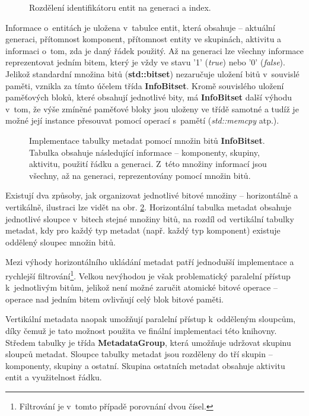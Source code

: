 \begin{figure}[H]
	\begin{center}
	\end{center}
	\caption{Rozdělení identifikátoru entit na generaci a index.}
	\label{Fig:IMPLIdent}
\end{figure}

Informace o~entitách je uložena v~tabulce entit, která obsahuje -- aktuální generaci, přítomnost komponent, přítomnost entity ve skupinách, aktivitu a informaci o~tom, zda je daný řádek použitý. Až na generaci lze všechny informace reprezentovat jedním bitem, který je vždy ve stavu '1' (\emph{true}) nebo '0' (\emph{false}). Jelikož standardní množina bitů (\textbf{std::bitset}) nezaručuje uložení bitů v~souvislé paměti, vznikla za tímto účelem třída \textbf{InfoBitset}. Kromě souvislého uložení paměťových bloků, které obsahují jednotlivé bity, má \textbf{InfoBitset} další výhodu v~tom, že výše zmíněné paměťové bloky jsou uloženy ve třídě samotné a tudíž je možné její instance přesouvat pomocí operací s~pamětí (\emph{std::memcpy} atp.).

\begin{figure}[H]
	\begin{center}
	\end{center}
	\caption{Implementace tabulky metadat pomocí množin bitů \textbf{InfoBitset}. Tabulka obsahuje následující informace -- komponenty, skupiny, aktivitu, použití řádku a generaci. Z~této množiny informací jsou všechny, až na generaci, reprezentovány pomocí množin bitů.}
	\label{Fig:IMPLMetadata}
\end{figure}

Existují dva způsoby, jak organizovat jednotlivé bitové množiny -- horizontálně a vertikálně, ilustraci lze vidět na obr. \ref{Fig:IMPLMetadata}. Horizontální tabulka metadat obsahuje jednotlivé sloupce v~bitech stejné množiny bitů, na rozdíl od vertikální tabulky metadat, kdy pro každý typ metadat (např. každý typ komponent) existuje oddělený sloupec množin bitů. 

Mezi výhody horizontálního ukládání metadat patří jednodušší implementace a rychlejší filtrování\footnote{Filtrování je v~tomto případě porovnání dvou čísel.}. Velkou nevýhodou je však problematický paralelní přístup k~jednotlivým bitům, jelikož není možné zaručit atomické bitové operace -- operace nad jedním bitem ovlivňují celý blok bitové paměti. 

Vertikální metadata naopak umožňují paralelní přístup k~odděleným sloupcům, díky čemuž je tato možnost použita ve finální implementaci této knihovny. Středem tabulky je třída \textbf{MetadataGroup}, která umožňuje udržovat skupinu sloupců metadat. Sloupce tabulky metadat jsou rozděleny do tří skupin -- komponenty, skupiny a ostatní. Skupina ostatních metadat obsahuje aktivitu entit a využitelnost řádku.

